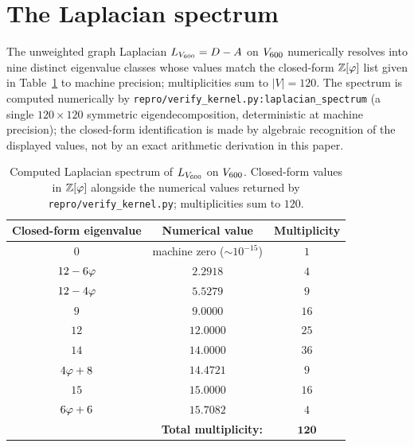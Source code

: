 \section{The Laplacian spectrum}\label{sec:spectrum}

The unweighted graph Laplacian $L_{V_{600}} = D - A$ on $V_{600}$
numerically resolves into nine distinct eigenvalue classes whose
values match the closed-form $\mathbb{Z}[\varphi]$ list given in
Table~\ref{tab:spectrum} to machine precision; multiplicities sum
to $|V| = 120$. The spectrum is computed numerically by
\texttt{repro/verify\_kernel.py:laplacian\_spectrum} (a single
$120\times 120$ symmetric eigendecomposition, deterministic at
machine precision); the closed-form identification is made by
algebraic recognition of the displayed values, not by an exact
arithmetic derivation in this paper.

\begin{table}[ht]
\centering
\small
\caption{Computed Laplacian spectrum of $L_{V_{600}}$ on $V_{600}$.
Closed-form values in $\mathbb{Z}[\varphi]$ alongside the numerical
values returned by \texttt{repro/verify\_kernel.py}; multiplicities
sum to $120$.}
\label{tab:spectrum}
\begin{tabular}{c c c}
\toprule
Closed-form eigenvalue & Numerical value & Multiplicity \\
\midrule
$0$            & machine zero ($\sim 10^{-15}$)         & $1$ \\
$12 - 6\varphi$    & $2.2918$  & $4$ \\
$12 - 4\varphi$    & $5.5279$  & $9$ \\
$9$            & $9.0000$  & $16$ \\
$12$           & $12.0000$ & $25$ \\
$14$           & $14.0000$ & $36$ \\
$4\varphi + 8$     & $14.4721$ & $9$ \\
$15$           & $15.0000$ & $16$ \\
$6\varphi + 6$     & $15.7082$ & $4$ \\
\midrule
\multicolumn{2}{r}{\textbf{Total multiplicity:}} & $\mathbf{120}$ \\
\bottomrule
\end{tabular}
\end{table}


